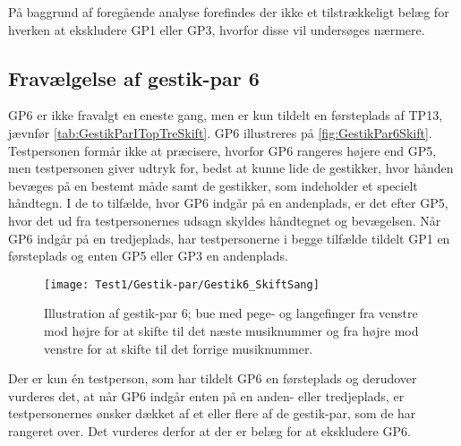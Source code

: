 På baggrund af foregående analyse forefindes der ikke et tilstrækkeligt belæg for hverken at ekskludere GP1 eller GP3, hvorfor disse vil undersøges nærmere. \blankline
%
\subsection{Fravælgelse af gestik-par 6}
\label{app:TestresultaterFravalgtGP6}
%
GP6 er ikke fravalgt en eneste gang, men er kun tildelt en førsteplads af TP13, jævnfør \autoref{tab:GestikParITopTreSkift}. GP6 illustreres på \autoref{fig:GestikPar6Skift}. Testpersonen formår ikke at præcisere, hvorfor GP6 rangeres højere end GP5, men testpersonen giver udtryk for, bedst at kunne lide de gestikker, hvor hånden bevæges på en bestemt måde samt de gestikker, som indeholder et specielt håndtegn. I de to tilfælde, hvor GP6 indgår på en andenplads, er det efter GP5, hvor det ud fra testpersonernes udsagn skyldes håndtegnet og bevægelsen. Når GP6 indgår på en tredjeplads, har testpersonerne i begge tilfælde tildelt GP1 en førsteplads og enten GP5 eller GP3 en andenplads. 
%
\begin{figure}[H]
	\centering
	\texttt{[image: Test1/Gestik-par/Gestik6\_SkiftSang]}
	\caption{Illustration af gestik-par 6; bue med pege- og langefinger fra venstre mod højre for at skifte til det næste musiknummer og fra højre mod venstre for at skifte til det forrige musiknummer.}
	\label{fig:GestikPar6Skift}
\end{figure}
\noindent
%                
Der er kun én testperson, som har tildelt GP6 en førsteplads og derudover vurderes det, at når GP6 indgår enten på en anden- eller tredjeplads, er testpersonernes ønsker dækket af et eller flere af de gestik-par, som de har rangeret over. Det vurderes derfor at der er belæg for at ekskludere GP6.
%
